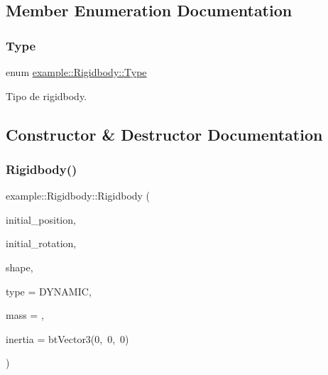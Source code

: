 \subsection{Member Enumeration Documentation}
\mbox{\label{classexample_1_1_rigidbody_a527ee68e1748a5a6014b7fcbe9f86e3d}} 
\subsubsection{\texorpdfstring{Type}{Type}}
{\footnotesize\ttfamily enum \mbox{\hyperlink{classexample_1_1_rigidbody_a527ee68e1748a5a6014b7fcbe9f86e3d}{example\+::\+Rigidbody\+::\+Type}}}



Tipo de rigidbody. 



\subsection{Constructor \& Destructor Documentation}
\mbox{\label{classexample_1_1_rigidbody_adbc37f0858cb94f23f0a6167ffbf34f5}} 
\subsubsection{\texorpdfstring{Rigidbody()}{Rigidbody()}}
{\footnotesize\ttfamily example\+::\+Rigidbody\+::\+Rigidbody (\begin{DoxyParamCaption}\item[{bt\+Vector3 \&}]{initial\+\_\+position,  }\item[{bt\+Quaternion \&}]{initial\+\_\+rotation,  }\item[{const std\+::shared\+\_\+ptr$<$ bt\+Collision\+Shape $>$ \&}]{shape,  }\item[{\mbox{\hyperlink{classexample_1_1_rigidbody_a527ee68e1748a5a6014b7fcbe9f86e3d}{Type}}}]{type = {\ttfamily DYNAMIC},  }\item[{bt\+Scalar}]{mass = {},  }\item[{bt\+Vector3}]{inertia = {\ttfamily btVector3(0,~0,~0)} }\end{DoxyParamCaption})}



